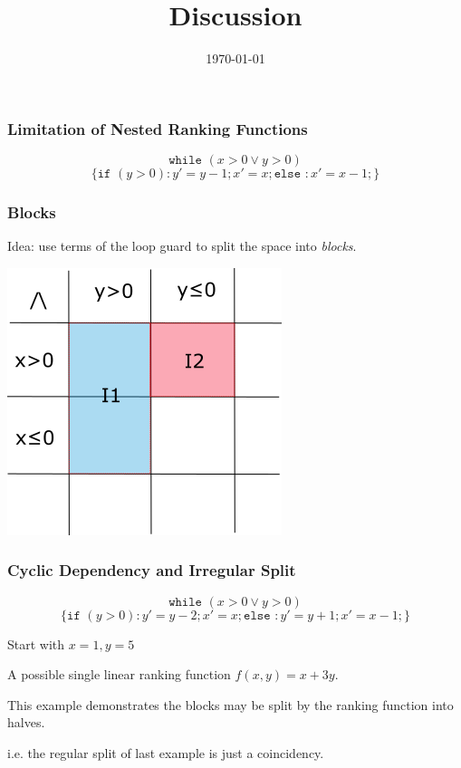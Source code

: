 \documentclass[11pt]{beamer}
\title{Discussion}
\date{\today}
\begin{document}
\maketitle



\begin{frame}\frametitle{Limitation of Nested Ranking Functions}

\begin{example}

\[\texttt{while }(x > 0 \vee y > 0) \]
\[\{\texttt{if }(y > 0): y' = y - 1; x ' = x;\texttt{else }: x' = x - 1;\}\]
\end{example}

\end{frame}


\begin{frame}\frametitle{Blocks}
Idea: use terms of the loop guard to split the space into \textit{blocks}.
\begin{center}

\includegraphics[scale = 0.65]{block.png}

\end{center}
\end{frame}
\begin{frame}\frametitle{Cyclic Dependency and Irregular Split}

\begin{example}

\[\texttt{while }(x > 0 \vee y > 0) \]
\[\{\texttt{if }(y > 0): y' = y - 2; x ' = x;\texttt{else }: y' = y + 1;x' = x - 1;\}\]

Start with $x = 1, y = 5$


A possible single linear ranking function $f(x, y) = x + 3y$.

This example demonstrates the blocks may be split by the ranking function into halves. 

i.e. the regular split of last example is just a coincidency.

\end{example}

\end{frame}
\end{document}
